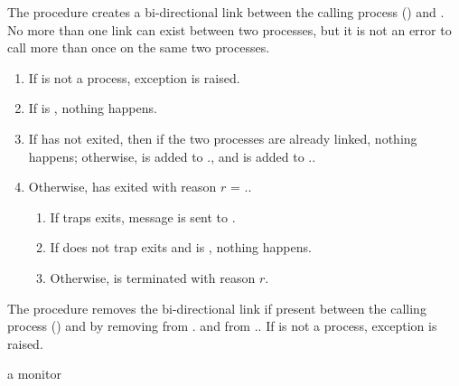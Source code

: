 \begin{procedure}
\end{procedure}
\returns{} 

The  procedure creates a bi-directional link between the
calling process () and . No more than one link
can exist between two processes, but it is not an error to call
 more than once on the same two processes.

\begin{enumerate}
\item If  is not a process, exception  is raised.
\item If  is , nothing happens.
\item If  has not exited, then if the two processes are
  already linked, nothing happens; otherwise,  is added to
  ., and  is added to
  ..
\item Otherwise,  has exited with reason $r$ =
  ..
  \begin{enumerate}
  \item If  traps exits, message 
    is sent to .
  \item If  does not trap exits and  is ,
    nothing happens.
  \item Otherwise,  is terminated with reason $r$.
  \end{enumerate}
\end{enumerate}

\begin{procedure}
\end{procedure}
\returns{} 

The  procedure removes the bi-directional link if
present between the calling process () and  by
removing  from . and
 from ..  If  is not
a process, exception  is
raised.

\begin{procedure}
\end{procedure}
\returns{} a monitor

